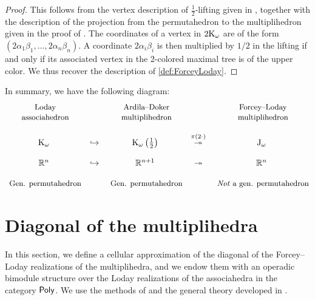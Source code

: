 \documentclass[twoside, 12pt]{amsart}
\theoremstyle{remark}
\begin{document}
\begin{proof} 
  This follows from the vertex description of $\tfrac{1}{2}$-lifting given in \cite[Definition 3.5.3]{Doker11}, together with the description of the projection from the permutahedron to the multiplihedron given in the proof of \cite[Theorem 3.3.6]{Doker11}. 
  The coordinates of a vertex in $2 \mathrm{K}_\omega$ are of the form $(2\alpha_1\beta_1, \ldots, 2\alpha_n\beta_n)$. 
  A coordinate $2\alpha_i\beta_i$ is then multiplied by $1/2$ in the lifting if and only if its associated vertex in the 2-colored maximal tree is of the upper color. 
  We thus recover the description of \cref{def:ForceyLoday}.
\end{proof}

In summary, we have the following diagram:
\medskip
\begin{equation*}
\begin{matrix}
  $ \small  \text{Loday}$ & & $ \small \text{Ardila--Doker}$ &  & $ \small \text{Forcey--Loday}$ \\
  $ \small  \text{associahedron}$ & & $ \small \text{multiplihedron}$ &  & $ \small \text{multiplihedron}$ \\
  & &  &  & \\
  \K_\omega & \hookrightarrow & \K_\omega \left(\tfrac{1}{2}\right) & \overset{\pi ( 2 \cdot ) }{\twoheadrightarrow} & \J_\omega \\
   & &  &  & \\
  \RR^n & \hookrightarrow & \RR^{n+1} & \twoheadrightarrow & \RR^n \\
  & &  &  & \\
  $ \small \text{Gen. permutahedron}$ & & $ \small \text{Gen. permutahedron}$ &  & $ \small \textit{Not}\text{ a gen. permutahedron}$
\end{matrix}
\end{equation*}


\section{Diagonal of the multiplihedra}
\label{sec:II}

In this section, we define a cellular approximation of the diagonal of the Forcey--Loday realizations of the multiplihedra, and we endow them with an operadic bimodule structure over the Loday realizations of the associahedra in the category $\mathsf{Poly}$. 
We use the methods of \cite{MTTV19} and the general theory developed in \cite{LA21}.
\end{document}
